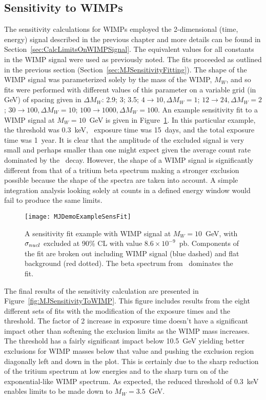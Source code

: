 		\subsection{Sensitivity to WIMPs}
		\label{sec:MJSensitivityToWIMP}
		
	The sensitivity calculations for WIMPs employed the 2-dimensional (time, energy) signal described in the previous chapter and more details can be found in Section~\ref{sec:CalcLimitsOnWIMPSignal}.  The equivalent values for all constants in the WIMP signal were used as previously noted.  The fits proceeded as outlined in the previous section (Section~\ref{sec:MJSensitivityFitting}).  The shape of the WIMP signal was parameterized solely by the mass of the WIMP, $M_{W}$, and so fits were performed with different values of this parameter on a variable grid (in GeV) of spacing given in $\Delta M_{W}$: 2.9; 3; 3.5; $4\to10, \Delta M_{W} = 1$; $12\to24, \Delta M_{W} = 2$; $30\to100, \Delta M_{W} = 10$; $100\to1000, \Delta M_{W} = 100$.  An example sensitivity fit to a WIMP signal at $M_{W}=10$~GeV is given in Figure~\ref{fig:MJSensitivityToWIMPExample}.  In this particular example, the threshold was 0.3~keV, \hthree~exposure time was 15~days, and the total exposure time was 1~year.  It is clear that the amplitude of the excluded signal is very small and perhaps smaller than one might expect given the average count rate dominated by the \hthree~decay.  However, the shape of a WIMP signal is significantly different from that of a tritium beta spectrum making a stronger exclusion possible because the shape of the spectra are taken into account.  A simple integration analysis looking solely at counts in a defined energy window would fail to produce the same limits.  
		
			\begin{figure}
				\centering
				\texttt{[image: MJDemoExampleSensFit]}
				\caption[\MJ~\minmod WIMP sensitivity fit example.]{A sensitivity fit example with WIMP  
				signal at $M_{W}=10$~GeV, with $\sigma_{nucl}$ excluded at 90\% CL with value
				 $8.6\times10^{-9}$~pb.  Components of the fit are broken out including WIMP 
				 signal (blue dashed) and flat background (red dotted).  The beta spectrum from \hthree~dominates the fit.}
				\label{fig:MJSensitivityToWIMPExample}
			\end{figure}
	
	The final results of the sensitivity calculation are presented in Figure~\ref{fig:MJSensitivityToWIMP}.  This figure includes results from the eight different sets of fits with the modification of the exposure times and the threshold.  The factor of 2 increase in exposure time doesn't have a significant impact other than softening the exclusion limits as the WIMP mass increases.  The threshold has a fairly significant impact below 10.5~GeV yielding better exclusions for WIMP masses below that value and pushing the exclusion region diagonally left and down in the plot.  This is certainly due to the sharp reduction of the tritium spectrum at low energies and to the sharp turn on of the exponential-like WIMP spectrum.  As expected, the reduced threshold of 0.3~keV enables limits to be made down to $M_{W}=3.5$~GeV.  
	
